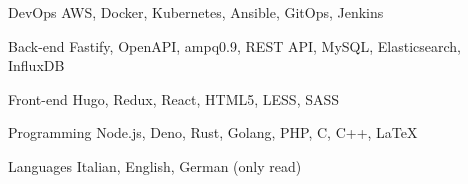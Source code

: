 

\begin{cvskills}

  \cvskill
    {DevOps} %
    {AWS, Docker, Kubernetes, Ansible, GitOps, Jenkins} %

  \cvskill
    {Back-end} %
    {Fastify, OpenAPI, ampq0.9, REST API, MySQL, Elasticsearch, InfluxDB} %

  \cvskill
    {Front-end} %
    {Hugo, Redux, React, HTML5, LESS, SASS} %

  \cvskill
    {Programming} %
    {Node.js, Deno, Rust, Golang, PHP, C, C++, LaTeX} %

  \cvskill
    {Languages} %
    {Italian, English, German (only read)} %

\end{cvskills}